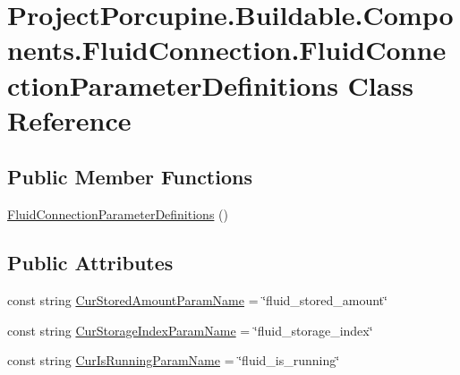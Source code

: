 \hypertarget{class_project_porcupine_1_1_buildable_1_1_components_1_1_fluid_connection_1_1_fluid_connection_parameter_definitions}{}\section{Project\+Porcupine.\+Buildable.\+Components.\+Fluid\+Connection.\+Fluid\+Connection\+Parameter\+Definitions Class Reference}
\label{class_project_porcupine_1_1_buildable_1_1_components_1_1_fluid_connection_1_1_fluid_connection_parameter_definitions}
\subsection*{Public Member Functions}
\begin{DoxyCompactItemize}
\item 
\hyperlink{class_project_porcupine_1_1_buildable_1_1_components_1_1_fluid_connection_1_1_fluid_connection_parameter_definitions_a2e01c623157230239cd33ea6d7ba306a}{Fluid\+Connection\+Parameter\+Definitions} ()
\end{DoxyCompactItemize}
\subsection*{Public Attributes}
\begin{DoxyCompactItemize}
\item 
const string \hyperlink{class_project_porcupine_1_1_buildable_1_1_components_1_1_fluid_connection_1_1_fluid_connection_parameter_definitions_a4e3e55d7fcdc63c408b7e1b574871772}{Cur\+Stored\+Amount\+Param\+Name} = \char`\"{}fluid\+\_\+stored\+\_\+amount\char`\"{}
\item 
const string \hyperlink{class_project_porcupine_1_1_buildable_1_1_components_1_1_fluid_connection_1_1_fluid_connection_parameter_definitions_ac091a2ad4fcc958458bc61d52da00326}{Cur\+Storage\+Index\+Param\+Name} = \char`\"{}fluid\+\_\+storage\+\_\+index\char`\"{}
\item 
const string \hyperlink{class_project_porcupine_1_1_buildable_1_1_components_1_1_fluid_connection_1_1_fluid_connection_parameter_definitions_a113297be245375c8d084c3bcdb826b58}{Cur\+Is\+Running\+Param\+Name} = \char`\"{}fluid\+\_\+is\+\_\+running\char`\"{}
\end{DoxyCompactItemize}
